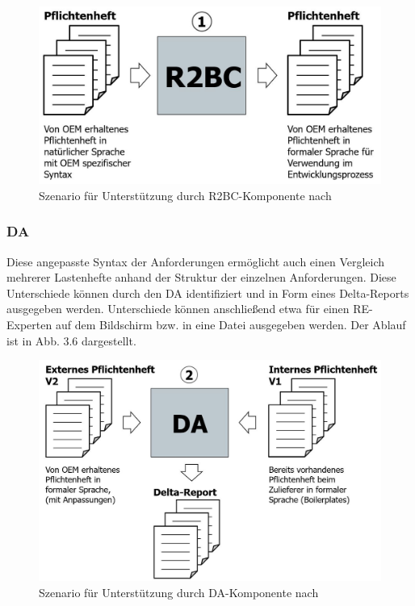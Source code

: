 \documentclass[12pt]{report}
\begin{document}
\begin{figure}[h!]
\begin{center}
\includegraphics[scale=0.5]{Bilder/Prozess-R2BC.jpg}
\caption{Szenario für Unterstützung durch R2BC-Komponente nach \cite{zh19}}
\end{center}
\end{figure}

\subsubsection{DA}
Diese angepasste Syntax der Anforderungen ermöglicht auch einen Vergleich mehrerer Lastenhefte anhand der Struktur der einzelnen Anforderungen. Diese Unterschiede können durch den DA identifiziert und in Form eines Delta-Reports ausgegeben werden. Unterschiede können anschließend etwa für einen RE-Experten auf dem Bildschirm bzw. in eine Datei ausgegeben werden. Der Ablauf ist in Abb. 3.6 dargestellt.

\begin{figure}[h!]
\begin{center}
\includegraphics[scale=0.55]{Bilder/Prozess-DA.jpg}
\caption{Szenario für Unterstützung durch DA-Komponente nach \cite{zh19}}
\end{center}
\end{figure}
\end{document}
